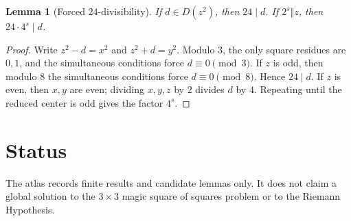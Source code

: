 \documentclass{amsart}
\newtheorem{lemma}[theorem]{Lemma}
\theoremstyle{definition}
\begin{document}
\begin{lemma}[Forced \(24\)-divisibility]
If \(d\in D(z^2)\), then \(24\mid d\). If \(2^s\Vert z\), then \(24\cdot 4^s\mid d\).
\end{lemma}

\begin{proof}
Write \(z^2-d=x^2\) and \(z^2+d=y^2\). Modulo \(3\), the only square residues are \(0,1\), and the simultaneous conditions force \(d\equiv0\pmod3\). If \(z\) is odd, then modulo \(8\) the simultaneous conditions force \(d\equiv0\pmod8\). Hence \(24\mid d\). If \(z\) is even, then \(x,y\) are even; dividing \(x,y,z\) by \(2\) divides \(d\) by \(4\). Repeating until the reduced center is odd gives the factor \(4^s\).
\end{proof}

\section{Status}
The atlas records finite results and candidate lemmas only. It does not claim a global solution to the \(3\times3\) magic square of squares problem or to the Riemann Hypothesis.



\end{document}
